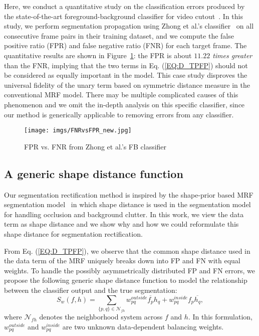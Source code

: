 \documentclass[10pt,journal,compsoc]{newIEEEtran}
\begin{document}
Here, we conduct a quantitative study on the classification errors produced by the state-of-the-art foreground-background classifier for video cutout~\cite{Zhong2012UDC_SIGGRAPHAsia}. In this study, we perform segmentation propagation using Zhong et al.'s classifier~\cite{Zhong2012UDC_SIGGRAPHAsia} on all consecutive frame pairs in their training dataset, and we compute the false positive ratio (FPR) and false negative ratio (FNR) for each target frame. The quantitative results are shown in Figure~\ref{FIG:StatEvid}: the FPR is about {\em $11.22$ times greater} than the FNR, implying that the two terms in Eq. (\ref{EQ:D_TPFP}) should not be considered as equally important in the model. This case study disproves the universal fidelity of the unary term based on symmetric distance measure in the conventional MRF model. There may be multiple complicated causes of this phenomenon and we omit the in-depth analysis on this specific classifier, since our method is generically applicable to removing errors from any classifier.
\begin{figure}
	\centering
	\texttt{[image: imgs/FNRvsFPR\_new.jpg]}
	\caption{FPR vs. FNR from Zhong et al.'s FB classifier \cite{Zhong2012UDC_SIGGRAPHAsia}}\label{FIG:StatEvid}
\end{figure}\subsection{A generic shape distance function}
Our segmentation rectification method is inspired by the shape-prior based MRF segmentation model~\cite{Freedman2005ShapePriorGC,Vu2008Shape} in which shape distance is used in the segmentation model for handling occlusion and background clutter. In this work, we view the data term as shape distance and we show why and how we could reformulate this shape distance for segmentation rectification.

From Eq. (\ref{EQ:D_TPFP}), we observe that the common shape distance used in the data term of the MRF uniquely breaks down into FP and FN with equal weights. To handle the possibly asymmetrically distributed FP and FN errors, we propose the following generic shape distance function to model the relationship between the classifier output and the true segmentation:
\begin{equation}\label{EQ:SDist}
S_w(f,h) = \sum_{\{p,q\}\in\mathcal{N}_{fh}} w^{outside}_{pq}\overline{f_p}h_{q}+w^{inside}_{pq}f_p\overline{h_{q}},
\end{equation}
where $\mathcal{N}_{fh}$ denotes the neighborhood system across $f$ and $h$. In this formulation, $w^{outside}_{pq}$ and $w^{inside}_{pq}$ are two unknown data-dependent balancing weights.
\end{document}
